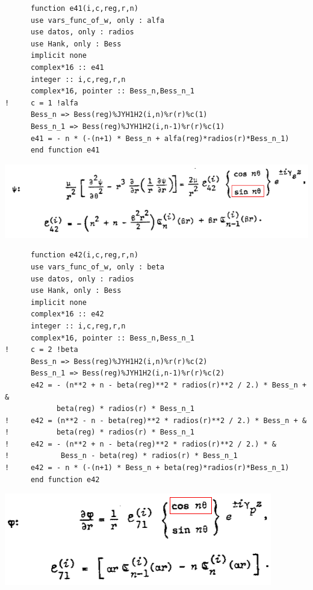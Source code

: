 \documentclass [11pt,spanish]{article}
\begin{document}
\begingroup
\fontsize{10pt}{12pt}
\selectfont
{}
\begin{shaded}
\begin{verbatim}
      function e41(i,c,reg,r,n)
      use vars_func_of_w, only : alfa
      use datos, only : radios
      use Hank, only : Bess
      implicit none
      complex*16 :: e41
      integer :: i,c,reg,r,n
      complex*16, pointer :: Bess_n,Bess_n_1
!     c = 1 !alfa
      Bess_n => Bess(reg)%JYH1H2(i,n)%r(r)%c(1)
      Bess_n_1 => Bess(reg)%JYH1H2(i,n-1)%r(r)%c(1)
      e41 = - n * (-(n+1) * Bess_n + alfa(reg)*radios(r)*Bess_n_1)
      end function e41
\end{verbatim}
\end{shaded}
\endgroup
\includegraphics[scale=0.5]{e42}
\begingroup
\fontsize{10pt}{12pt}
\selectfont
{}
\begin{shaded}
\begin{verbatim}
      function e42(i,c,reg,r,n)
      use vars_func_of_w, only : beta
      use datos, only : radios
      use Hank, only : Bess
      implicit none
      complex*16 :: e42
      integer :: i,c,reg,r,n
      complex*16, pointer :: Bess_n,Bess_n_1
!     c = 2 !beta
      Bess_n => Bess(reg)%JYH1H2(i,n)%r(r)%c(2)
      Bess_n_1 => Bess(reg)%JYH1H2(i,n-1)%r(r)%c(2)
      e42 = - (n**2 + n - beta(reg)**2 * radios(r)**2 / 2.) * Bess_n + &
            beta(reg) * radios(r) * Bess_n_1
!     e42 = (n**2 - n - beta(reg)**2 * radios(r)**2 / 2.) * Bess_n + &
!           beta(reg) * radios(r) * Bess_n_1
!     e42 = - (n**2 + n - beta(reg)**2 * radios(r)**2 / 2.) * &
!            Bess_n - beta(reg) * radios(r) * Bess_n_1      
!     e42 = - n * (-(n+1) * Bess_n + beta(reg)*radios(r)*Bess_n_1)
      end function e42
\end{verbatim}
\end{shaded}
\endgroup
\includegraphics[scale=0.5]{e71}
\end{document}
